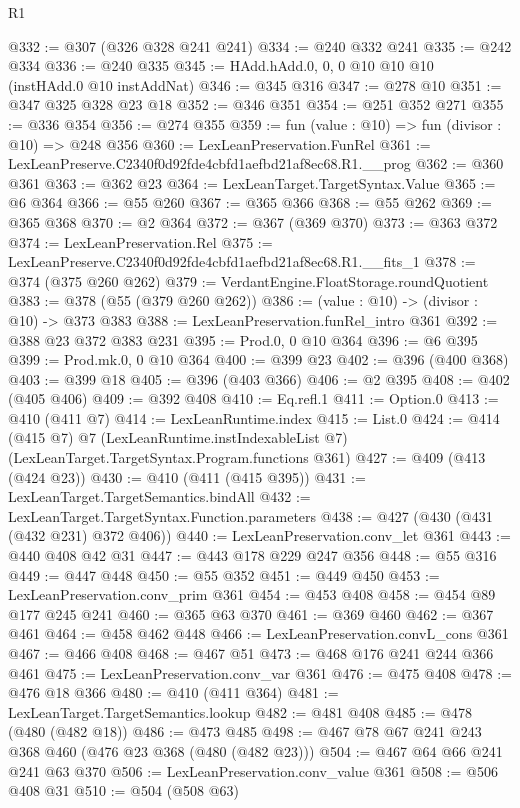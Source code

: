 \begin{lexlean}{R1}
\begin{coremodule}
@332 := @307 (@326 @328 @241 @241)
@334 := @240 @332 @241
@335 := @242 @334
@336 := @240 @335
@345 := HAdd.hAdd.{0, 0, 0} @10 @10 @10 (instHAdd.{0} @10 instAddNat)
@346 := @345 @316
@347 := @278 @10
@351 := @347 @325 @328 @23 @18
@352 := @346 @351
@354 := @251 @352 @271
@355 := @336 @354
@356 := @274 @355
@359 := fun (value : @10) => fun (divisor : @10) => @248 @356
@360 := LexLeanPreservation.FunRel
@361 := LexLeanPreserve.C2340f0d92fde4cbfd1aefbd21af8ec68.R1.__prog
@362 := @360 @361
@363 := @362 @23
@364 := LexLeanTarget.TargetSyntax.Value
@365 := @6 @364
@366 := @55 @260
@367 := @365 @366
@368 := @55 @262
@369 := @365 @368
@370 := @2 @364
@372 := @367 (@369 @370)
@373 := @363 @372
@374 := LexLeanPreservation.Rel
@375 := LexLeanPreserve.C2340f0d92fde4cbfd1aefbd21af8ec68.R1.__fits_1
@378 := @374 (@375 @260 @262)
@379 := VerdantEngine.FloatStorage.roundQuotient
@383 := @378 (@55 (@379 @260 @262))
@386 := (value : @10) -> (divisor : @10) -> @373 @383
@388 := LexLeanPreservation.funRel_intro @361
@392 := @388 @23 @372 @383 @231
@395 := Prod.{0, 0} @10 @364
@396 := @6 @395
@399 := Prod.mk.{0, 0} @10 @364
@400 := @399 @23
@402 := @396 (@400 @368)
@403 := @399 @18
@405 := @396 (@403 @366)
@406 := @2 @395
@408 := @402 (@405 @406)
@409 := @392 @408
@410 := Eq.refl.{1}
@411 := Option.{0}
@413 := @410 (@411 @7)
@414 := LexLeanRuntime.index
@415 := List.{0}
@424 := @414
    (@415 @7)
    @7
    (LexLeanRuntime.instIndexableList @7)
    (LexLeanTarget.TargetSyntax.Program.functions @361)
@427 := @409 (@413 (@424 @23))
@430 := @410 (@411 (@415 @395))
@431 := LexLeanTarget.TargetSemantics.bindAll
@432 := LexLeanTarget.TargetSyntax.Function.parameters
@438 := @427 (@430 (@431 (@432 @231) @372 @406))
@440 := LexLeanPreservation.conv_let @361
@443 := @440 @408 @42 @31
@447 := @443 @178 @229 @247 @356
@448 := @55 @316
@449 := @447 @448
@450 := @55 @352
@451 := @449 @450
@453 := LexLeanPreservation.conv_prim @361
@454 := @453 @408
@458 := @454 @89 @177 @245 @241
@460 := @365 @63 @370
@461 := @369 @460
@462 := @367 @461
@464 := @458 @462 @448
@466 := LexLeanPreservation.convL_cons @361
@467 := @466 @408
@468 := @467 @51
@473 := @468 @176 @241 @244 @366 @461
@475 := LexLeanPreservation.conv_var @361
@476 := @475 @408
@478 := @476 @18 @366
@480 := @410 (@411 @364)
@481 := LexLeanTarget.TargetSemantics.lookup
@482 := @481 @408
@485 := @478 (@480 (@482 @18))
@486 := @473 @485
@498 := @467 @78 @67 @241 @243 @368 @460 (@476 @23 @368 (@480 (@482 @23)))
@504 := @467 @64 @66 @241 @241 @63 @370
@506 := LexLeanPreservation.conv_value @361
@508 := @506 @408 @31
@510 := @504 (@508 @63)

\end{coremodule}
\end{lexlean}
